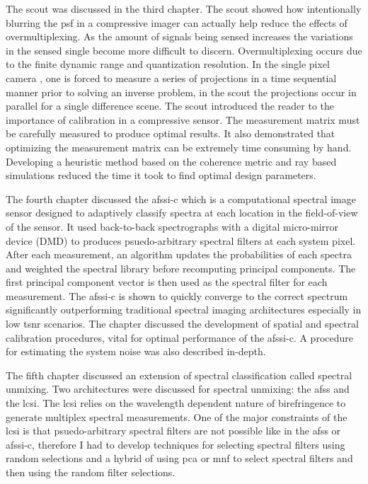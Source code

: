The \acrfull{scout} was discussed in the third chapter. The \gls{scout} showed how intentionally blurring the \acrfull{psf} in a compressive imager can actually help reduce the effects of overmultiplexing. As the amount of signals being sensed increases the variations in the sensed single become more difficult to discern. Overmultiplexing occurs due to the finite dynamic range and quantization resolution. In the single pixel camera \cite{duarte2008single}, one is forced to measure a series of projections in a time sequential manner prior to solving an inverse problem, in the \gls{scout} the projections occur in parallel for a single difference scene. The \gls{scout} introduced the reader to the importance of calibration in a compressive sensor. The measurement matrix must be carefully measured to produce optimal results. It also demonstrated that optimizing the measurement matrix can be extremely time consuming by hand. Developing a heuristic method based on the coherence metric and ray based simulations reduced the time it took to find optimal design parameters. 

The fourth chapter discussed the \acrfull{afssi-c} which is a computational spectral image sensor designed to adaptively classify spectra at each location in the field-of-view of the sensor. It used back-to-back spectrographs with a digital micro-mirror device (DMD) to produces psuedo-arbitrary spectral filters at each system pixel. After each measurement, an algorithm updates the probabilities of each spectra and weighted the spectral library before recomputing principal components. The first principal component vector is then used as the spectral filter for each measurement. The \gls{afssi-c} is shown to quickly converge to the correct spectrum significantly outperforming traditional spectral imaging architectures especially in low \gls{tsnr} scenarios. The chapter discussed the development of spatial and spectral calibration procedures, vital for optimal performance of the \gls{afssi-c}. A procedure for estimating the system noise was also described in-depth. 

The fifth chapter discussed an extension of spectral classification called spectral unmixing. Two architectures were discussed for spectral unmixing: the \acrfull{afss} and the \acrfull{lcsi}. The \gls{lcsi} relies on the wavelength dependent nature of birefringence to generate multiplex spectral measurements. One of the major constraints of the \gls{lcsi} is that psuedo-arbitrary spectral filters are not possible like in the \gls{afss} or \gls{afssi-c}, therefore I had to develop techniques for selecting spectral filters using random selections and a hybrid of using \gls{pca} or \gls{mnf} to select spectral filters and then using the random filter selections. 

